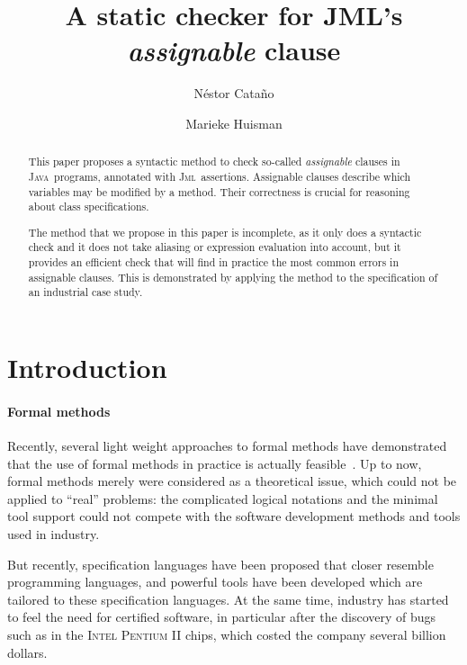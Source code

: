 \documentclass[a4paper]{llncs}
\title{A static checker for JML's \emph{assignable} clause}
\author{
  N\'estor Cata\~no
\and
  Marieke Huisman
}
\institute{
\email{\{Nestor.Catano, Marieke.Huisman\}@sophia.inria.fr} \\ 
  \inria\ Sophia-Antipolis, France  
}
\newcommand{\jml}{\textsc{Jml}}
\newcommand{\java}{\textsc{Java}}
\begin{document}
\fussy
\maketitle
\pagestyle{plain}

\begin{abstract}
This paper proposes a syntactic method to check so-called
\emph{assignable} clauses in \java\ programs, annotated with \jml\
assertions. Assignable clauses describe which variables may be
modified by a method. Their correctness is crucial for reasoning about 
class specifications. 

The method that we propose in this paper is incomplete, as it only
does a syntactic check and it does not take aliasing or expression
evaluation into account, but it provides an efficient check that will
find in practice the most common errors in assignable clauses. This is
demonstrated by applying the method to the specification of an
industrial case study.
\end{abstract}






\section{Introduction}
\label{sec-intro}

\paragraph{\bf Formal methods}

Recently, several light weight approaches to formal methods have
demonstrated that the use of formal methods in practice is actually
feasible~\cite{LeinoNS00,CatanoH02a}.  Up to now, formal methods
merely were considered as a theoretical issue, which could not be
applied to ``real'' problems: the complicated logical notations and
the minimal tool support could not compete with the software
development methods and tools used in industry.

But recently, specification languages have been proposed that closer
resemble programming languages, and powerful tools have been developed
which are tailored to these specification languages. At the same time,
industry has started to feel the need for certified software, in
particular after the discovery of bugs such as in the \textsc{Intel}
\textsc{Pentium II} chips, which costed the company several billion
dollars.
\end{document}
